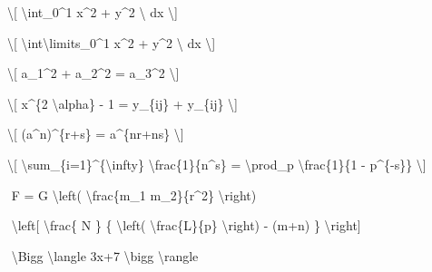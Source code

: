 \documentclass[12pt,a4paper,oneside,]{book}
\newenvironment{Shaded}{\begin{snugshade}}{\end{snugshade}}
\newcommand{\SpecialCharTok}[1]{\textcolor[rgb]{0.00,0.00,0.00}{#1}}
\newcommand{\SpecialStringTok}[1]{\textcolor[rgb]{0.31,0.60,0.02}{#1}}
\numberwithin{dummy}{section}
\theoremstyle{ocrenumbox}
\theoremstyle{blacknumex}
\theoremstyle{blacknumbox}
\theoremstyle{ocrenum}
\theoremstyle{ocrenum}
\begin{document}
\begin{Shaded}
\begin{Highlighting}[]
\SpecialStringTok{\textbackslash{}[ }\SpecialCharTok{\textbackslash{}int}\SpecialStringTok{\_0\^{}1 x\^{}2 + y\^{}2 }\SpecialCharTok{\textbackslash{} }\SpecialStringTok{dx \textbackslash{}]}

\SpecialStringTok{\textbackslash{}[ }\SpecialCharTok{\textbackslash{}int\textbackslash{}limits}\SpecialStringTok{\_0\^{}1 x\^{}2 + y\^{}2 }\SpecialCharTok{\textbackslash{} }\SpecialStringTok{dx \textbackslash{}]}

\SpecialStringTok{\textbackslash{}[ a\_1\^{}2 + a\_2\^{}2 = a\_3\^{}2 \textbackslash{}]}

\SpecialStringTok{\textbackslash{}[ x\^{}\{2 }\SpecialCharTok{\textbackslash{}alpha}\SpecialStringTok{\} {-} 1 = y\_\{ij\} + y\_\{ij\}  \textbackslash{}]}

\SpecialStringTok{\textbackslash{}[ (a\^{}n)\^{}\{r+s\} = a\^{}\{nr+ns\}  \textbackslash{}]}

\SpecialStringTok{\textbackslash{}[ }\SpecialCharTok{\textbackslash{}sum}\SpecialStringTok{\_\{i=1\}\^{}\{}\SpecialCharTok{\textbackslash{}infty}\SpecialStringTok{\} }\SpecialCharTok{\textbackslash{}frac}\SpecialStringTok{\{1\}\{n\^{}s\} }
\SpecialStringTok{= }\SpecialCharTok{\textbackslash{}prod}\SpecialStringTok{\_p }\SpecialCharTok{\textbackslash{}frac}\SpecialStringTok{\{1\}\{1 {-} p\^{}\{{-}s\}\} \textbackslash{}]}

\SpecialStringTok{$$ }
\SpecialStringTok{F = G }\SpecialCharTok{\textbackslash{}left}\SpecialStringTok{( }\SpecialCharTok{\textbackslash{}frac}\SpecialStringTok{\{m\_1 m\_2\}\{r\^{}2\} }\SpecialCharTok{\textbackslash{}right}\SpecialStringTok{)}
\SpecialStringTok{$$}

\SpecialStringTok{$$ }
\SpecialStringTok{ }\SpecialCharTok{\textbackslash{}left}\SpecialStringTok{[  }\SpecialCharTok{\textbackslash{}frac}\SpecialStringTok{\{ N \} \{ }\SpecialCharTok{\textbackslash{}left}\SpecialStringTok{( }\SpecialCharTok{\textbackslash{}frac}\SpecialStringTok{\{L\}\{p\} }\SpecialCharTok{\textbackslash{}right}\SpecialStringTok{)  {-} (m+n) \}  }\SpecialCharTok{\textbackslash{}right}\SpecialStringTok{]}
\SpecialStringTok{$$}

\SpecialStringTok{$$}
\SpecialStringTok{ }\SpecialCharTok{\textbackslash{}Bigg}\SpecialStringTok{ }\SpecialCharTok{\textbackslash{}langle}\SpecialStringTok{ 3x+7 }\SpecialCharTok{\textbackslash{}bigg}\SpecialStringTok{ }\SpecialCharTok{\textbackslash{}rangle}
\SpecialStringTok{$$}
\end{Highlighting}
\end{Shaded}
\end{document}
